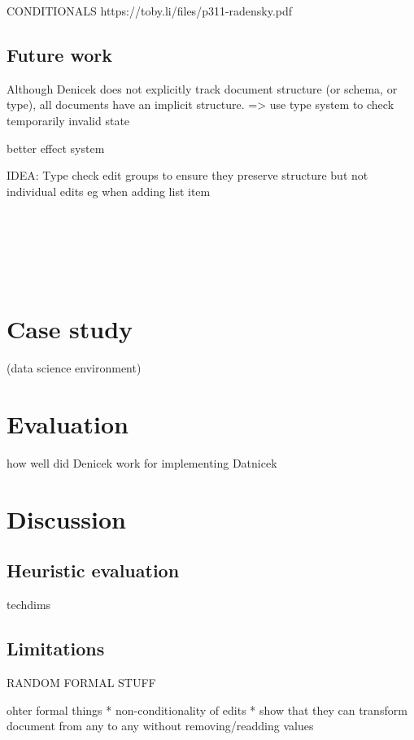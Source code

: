 \documentclass[sigconf,anonymous,screen]{acmart}
\begin{document}
CONDITIONALS
https://toby.li/files/p311-radensky.pdf


\subsection{Future work}
\label{sec:discuss-future}
Although Denicek does not explicitly track document structure (or schema, or type), all documents
have an implicit structure.
=> use type system to check temporarily invalid state

better effect system

IDEA: Type check edit groups to ensure they preserve structure but not individual edits eg when adding list item

~

~

~






\section{Case study}
\label{sec:case}
(data science environment)

\section{Evaluation}
\label{sec:eval}
how well did Denicek work for implementing Datnicek

\section{Discussion}




\subsection{Heuristic evaluation}

techdims

\subsection{Limitations}

RANDOM FORMAL STUFF

ohter formal things
* non-conditionality of edits
* show that they can transform document from any to any without removing/readding values
\end{document}
